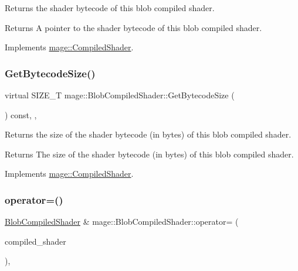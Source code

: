 Returns the shader bytecode of this blob compiled shader.

\begin{DoxyReturn}{Returns}
A pointer to the shader bytecode of this blob compiled shader. 
\end{DoxyReturn}


Implements \hyperlink{classmage_1_1_compiled_shader_a3d7a58d568dc30e66ea7488f28911127}{mage\+::\+Compiled\+Shader}.

\hypertarget{classmage_1_1_blob_compiled_shader_a685f2a4aac87aa785c22940075eb23ec}{}\label{classmage_1_1_blob_compiled_shader_a685f2a4aac87aa785c22940075eb23ec} 
\subsubsection{\texorpdfstring{Get\+Bytecode\+Size()}{GetBytecodeSize()}}
{\footnotesize\ttfamily virtual S\+I\+Z\+E\+\_\+T mage\+::\+Blob\+Compiled\+Shader\+::\+Get\+Bytecode\+Size (\begin{DoxyParamCaption}{ }\end{DoxyParamCaption}) const\hspace{0.3cm}{\ttfamily [override]}, {\ttfamily [virtual]}, {\ttfamily [noexcept]}}

Returns the size of the shader bytecode (in bytes) of this blob compiled shader.

\begin{DoxyReturn}{Returns}
The size of the shader bytecode (in bytes) of this blob compiled shader. 
\end{DoxyReturn}


Implements \hyperlink{classmage_1_1_compiled_shader_ae9dbc3c205d54cc89b9b0746b76b157b}{mage\+::\+Compiled\+Shader}.

\hypertarget{classmage_1_1_blob_compiled_shader_ae32c9ce0827db31d31551e24c542f060}{}\label{classmage_1_1_blob_compiled_shader_ae32c9ce0827db31d31551e24c542f060} 
\subsubsection{\texorpdfstring{operator=()}{operator=()}\hspace{0.1cm}{\footnotesize\ttfamily [1/2]}}
{\footnotesize\ttfamily \hyperlink{classmage_1_1_blob_compiled_shader}{Blob\+Compiled\+Shader} \& mage\+::\+Blob\+Compiled\+Shader\+::operator= (\begin{DoxyParamCaption}\item[{const \hyperlink{classmage_1_1_blob_compiled_shader}{Blob\+Compiled\+Shader} \&}]{compiled\+\_\+shader }\end{DoxyParamCaption})\hspace{0.3cm}{\ttfamily [default]}, {\ttfamily [noexcept]}}

